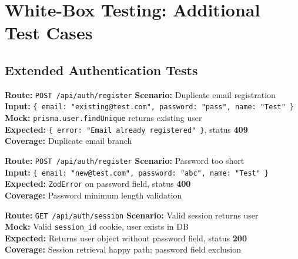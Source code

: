﻿\documentclass[12pt,a4paper]{report}
\newcommand{\pone}{\textbf{\color{p1red}P1}}
\newcommand{\ptwo}{\textbf{\color{p2orange}P2}}
\begin{document}
\chapter{White-Box Testing: Additional Test Cases}

\section{Extended Authentication Tests}

\begin{tcolorbox}[testbox,title={AUTH-017 \hfill \ptwo}]
\textbf{Route:} \texttt{POST /api/auth/register} \quad \textbf{Scenario:} Duplicate email registration \\
\textbf{Input:} \texttt{\{ email: "existing@test.com", password: "pass", name: "Test" \}} \\
\textbf{Mock:} \texttt{prisma.user.findUnique} returns existing user \\
\textbf{Expected:} \texttt{\{ error: "Email already registered" \}}, status \textbf{409} \\
\textbf{Coverage:} Duplicate email branch
\end{tcolorbox}

\begin{tcolorbox}[testbox,title={AUTH-018 \hfill \ptwo}]
\textbf{Route:} \texttt{POST /api/auth/register} \quad \textbf{Scenario:} Password too short \\
\textbf{Input:} \texttt{\{ email: "new@test.com", password: "abc", name: "Test" \}} \\
\textbf{Expected:} \texttt{ZodError} on password field, status \textbf{400} \\
\textbf{Coverage:} Password minimum length validation
\end{tcolorbox}

\begin{tcolorbox}[testbox,title={AUTH-019 \hfill \pone}]
\textbf{Route:} \texttt{GET /api/auth/session} \quad \textbf{Scenario:} Valid session returns user \\
\textbf{Mock:} Valid \texttt{session\_id} cookie, user exists in DB \\
\textbf{Expected:} Returns user object without password field, status \textbf{200} \\
\textbf{Coverage:} Session retrieval happy path; password field exclusion
\end{tcolorbox}
\end{document}
